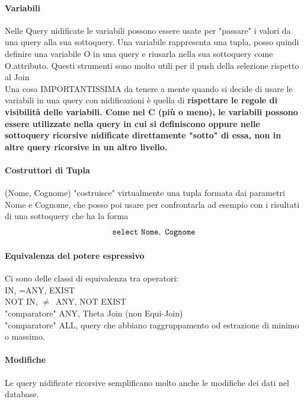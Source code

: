 \documentclass[11pt]{article} %
\begin{document}
\paragraph{Variabili}
Nelle Query nidificate le variabili possono essere usate per "passare" i valori da una query alla sua sottoquery. Una variabile rappresenta una tupla, posso quindi definire una variabile O in una query e riusarla nella sua sottoquery come O.attributo. Questi strumenti sono molto utili per il push della selezione rispetto al Join\\
Una cosa IMPORTANTISSIMA da tenere a mente quando si decide di usare le variabili in una query con nidificazioni è quella di \bf rispettare le regole di visibilità \rm delle variabili. Come nel C (più o meno), le variabili possono essere utilizzate nella query in cui si definiscono oppure nelle sottoquery ricorsive nidificate direttamente "sotto" di essa, non in altre query ricorsive in un altro livello.
\paragraph{Costruttori di Tupla}
(Nome, Cognome) "costruisce" virtualmente una tupla formata dai parametri Nome e Cognome, che posso poi usare per confrontarla ad esempio con i risultati di una sottoquery che ha la forma $$\tt select\ Nome,\ Cognome$$
\paragraph{Equivalenza del potere espressivo}
Ci sono delle classi di equivalenza tra operatori:\\
IN, =ANY, EXIST\\
NOT IN, $\ne$\ ANY, NOT EXIST\\
"comparatore" ANY, Theta Join (non Equi-Join)\\
"comparatore" ALL, query che abbiano raggruppamento od estrazione di minimo o massimo.
\paragraph{Modifiche}
Le query nidificate ricorsive semplificano molto anche le modifiche dei dati nel database.
\end{document}
